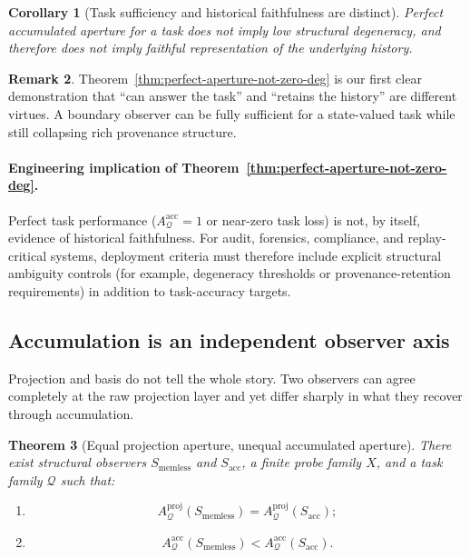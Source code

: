\documentclass[11pt,twoside]{article}
\newtheorem{theorem}{Theorem}[section]
\newtheorem{corollary}[theorem]{Corollary}
\theoremstyle{definition}
\newtheorem{remark}[theorem]{Remark}
\newcommand{\proj}{\mathrm{proj}}
\newcommand{\acc}{\mathrm{acc}}
\begin{document}
\begin{corollary}[Task sufficiency and historical faithfulness are distinct]
\label{cor:task-suff-vs-historical-faithfulness}
Perfect accumulated aperture for a task does not imply low structural degeneracy, and therefore does not imply faithful representation of the underlying history.
\end{corollary}

\begin{remark}
\label{rem:task-suff-vs-history}
Theorem~\ref{thm:perfect-aperture-not-zero-deg} is our first clear demonstration that ``can answer the task'' and ``retains the history'' are different virtues. A boundary observer can be fully sufficient for a state-valued task while still collapsing rich provenance structure.
\end{remark}

\paragraph{Engineering implication of Theorem~\ref{thm:perfect-aperture-not-zero-deg}.}
Perfect task performance (\(A^{\acc}_{\mathcal{Q}}=1\) or near-zero task loss) is not, by itself, evidence of historical faithfulness. For audit, forensics, compliance, and replay-critical systems, deployment criteria must therefore include explicit structural ambiguity controls (for example, degeneracy thresholds or provenance-retention requirements) in addition to task-accuracy targets.

\subsection{Accumulation is an independent observer axis}
\label{subsec:acc-independent-axis}

Projection and basis do not tell the whole story. Two observers can agree completely at the raw projection layer and yet differ sharply in what they recover through accumulation.

\begin{theorem}[Equal projection aperture, unequal accumulated aperture]
\label{thm:equal-proj-unequal-acc}
There exist structural observers \(S_{\mathrm{memless}}\) and \(S_{\mathrm{acc}}\), a finite probe family \(X\), and a task family \(\mathcal{Q}\) such that:
\begin{enumerate}[leftmargin=*]
  \item
  \[
    A^{\proj}_{\mathcal{Q}}(S_{\mathrm{memless}})
    =
    A^{\proj}_{\mathcal{Q}}(S_{\mathrm{acc}});
  \]
  \item
  \[
    A^{\acc}_{\mathcal{Q}}(S_{\mathrm{memless}})
    <
    A^{\acc}_{\mathcal{Q}}(S_{\mathrm{acc}}).
  \]
\end{enumerate}
\end{theorem}
\end{document}
